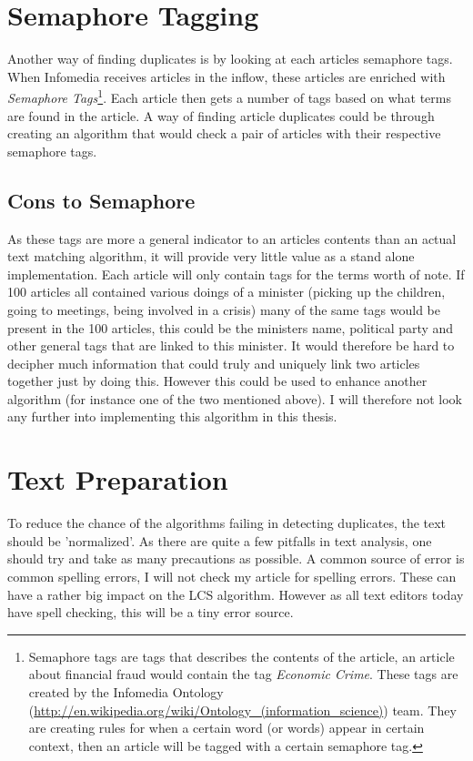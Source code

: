 \section{Semaphore Tagging}
Another way of finding duplicates is by looking at each articles semaphore tags. When Infomedia receives articles in the inflow, these articles are enriched with \textit{Semaphore Tags}\footnote{Semaphore tags are tags that describes the contents of the article, an article about financial fraud would contain the tag \textit{Economic Crime}. These tags are created by the Infomedia Ontology (\url{http://en.wikipedia.org/wiki/Ontology_(information_science)}) team. They are creating rules for when a certain word (or words) appear in certain context, then an article will be tagged with a certain semaphore tag.}. Each article then gets a number of tags based on what terms are found in the article. A way of finding article duplicates could be through creating an algorithm that would check a pair of articles with their respective semaphore tags.

\subsection{Cons to Semaphore}
As these tags are more a general indicator to an articles contents than an actual text matching algorithm, it will provide very little value as a stand alone implementation. Each article will only contain tags for the terms worth of note. If 100 articles all contained various doings of a minister (picking up the children, going to meetings, being involved in a crisis) many of the same tags would be present in the 100 articles, this could be the ministers name, political party and other general tags that are linked to this minister. It would therefore be hard to decipher much information that could truly and uniquely link two articles together just by doing this. However this could be used to enhance another algorithm (for instance one of the two mentioned above). I will therefore not look any further into implementing this algorithm in this thesis.

\section{Text Preparation}
To reduce the chance of the algorithms failing in detecting duplicates, the text should be 'normalized'. As there are quite a few pitfalls in text analysis, one should try and take as many precautions as possible. A common source of error is common spelling errors, I will not check my article for spelling errors. These can have a rather big impact on the LCS algorithm. However as all text editors today have spell checking, this will be a tiny error source.

